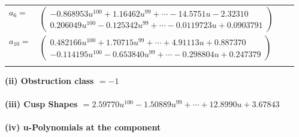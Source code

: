 \documentclass[1p]{elsarticle_modified}
\theoremstyle{definition}
\begin{document}
\begin{tabular}{m{7pt} m{180pt} m{7pt} m{180pt} }
\flushright $a_{6}=$&$\begin{pmatrix}-0.868953 u^{100}+1.16462 u^{99}+\cdots-14.5751 u-2.32310\\0.206049 u^{100}-0.125342 u^{99}+\cdots-0.0119723 u+0.0903791\end{pmatrix}$ \\
\flushright $a_{10}=$&$\begin{pmatrix}0.482166 u^{100}+1.70715 u^{99}+\cdots+4.91113 u+0.887370\\-0.114195 u^{100}-0.653840 u^{99}+\cdots-0.298804 u+0.247379\end{pmatrix}$\\&\end{tabular}
\flushleft \textbf{(ii) Obstruction class $= -1$}\\~\\
\flushleft \textbf{(iii) Cusp Shapes $= 2.59770 u^{100}-1.50889 u^{99}+\cdots+12.8990 u+3.67843$}\\~\\
\newpage\renewcommand{\arraystretch}{1}
\flushleft \textbf{(iv) u-Polynomials at the component}\newline \\
\end{document}
